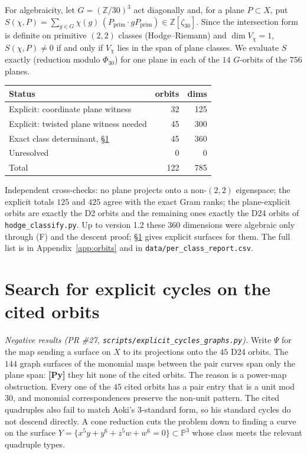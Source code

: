 \documentclass[11pt]{amsart}
\theoremstyle{remark}\newtheorem{remark}[theorem]{Remark}
\begin{document}
For algebraicity, let $G=(\mathbb{Z}/30)^3$ act diagonally and, for a plane $P\subset X$, put
$S(\chi,P)=\sum_{g\in G}\chi(g)\,(P_{\mathrm{prim}}\cdot gP_{\mathrm{prim}})\in\mathbb{Z}[\zeta_{30}]$.
Since the intersection form is definite on primitive $(2,2)$ classes (Hodge--Riemann) and
$\dim V_\chi=1$, $S(\chi,P)\neq0$ if and only if $V_\chi$ lies in the span of plane classes. We evaluate
$S$ exactly (reduction modulo $\Phi_{30}$) for one plane in each of the $14$ $G$-orbits of the
$756$ planes.
\begin{center}\small
\begin{tabular}{lrr}\toprule
Status & orbits & dims\\\midrule
Explicit: coordinate plane witness & 32 & 125\\
Explicit: twisted plane witness needed & 45 & 300\\
Exact class determinant, \S\ref{sec:search} & 45 & 360\\
Unresolved & 0 & 0\\\midrule
Total & 122 & 785\\\bottomrule
\end{tabular}\end{center}
Independent cross-checks: no plane projects onto a non-$(2,2)$ eigenspace; the explicit totals
$125$ and $425$ agree with the exact Gram ranks; the plane-explicit orbits are exactly the D2 orbits
and the remaining ones exactly the D24 orbits of \texttt{hodge\_classify.py}. Up to version 1.2 these
$360$ dimensions were algebraic only through (F) and the descent proof; \S\ref{sec:search} gives
explicit surfaces for them. The full list is in
Appendix~\ref{app:orbits} and in \texttt{data/per\_class\_report.csv}.


\section{Search for explicit cycles on the cited orbits}\label{sec:search}
\emph{Negative results (PR \#27, \texttt{scripts/explicit\_cycles\_graphs.py}).} Write
$\Psi$ for the map sending a surface on $X$ to its projections onto the $45$ D24 orbits. The
$144$ graph surfaces of the monomial maps between the pair curves span only the plane span: \textbf{[Py]}
they hit none of the cited orbits. The reason is a power-map obstruction. Every one of the $45$ cited orbits has
a pair entry that is a unit mod $30$, and monomial correspondences preserve the
non-unit pattern. The cited quadruples also fail to match Aoki's 3-standard form, so his standard
cycles do not descend directly. A cone reduction cuts the problem down to finding a curve on the surface
$Y=\{x^5y+y^6+z^5w+w^6=0\}\subset\mathbb{P}^3$ whose class meets the relevant quadruple types.
\end{document}
